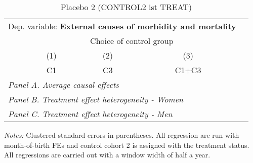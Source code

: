  \begin{table}[H] \centering \begin{threeparttable} \caption{Placebo 2 (CONTROL2 ist TREAT) } {\def\sym#1{\ifmmode^{#1}\else\(^{#1}\)\fi} \begin{tabular}{l*{4}{c}} \toprule \multicolumn{4}{l}{Dep. variable: \textbf{External causes of morbidity and mortality}} \\ & \multicolumn{3}{c}{Choice of control group} \\ \cmidrule(lr){2-4}
            &\multicolumn{1}{c}{(1)}&\multicolumn{1}{c}{(2)}&\multicolumn{1}{c}{(3)}\\
            &\multicolumn{1}{c}{C1}&\multicolumn{1}{c}{C3}&\multicolumn{1}{c}{C1+C3}\\
\midrule
 \multicolumn{4}{l}{\emph{Panel A. Average causal effects}} \\      \midrule\multicolumn{4}{l}{\emph{Panel B. Treatment effect heterogeneity - Women}} \\      \midrule\multicolumn{4}{l}{\emph{Panel C. Treatment effect heterogeneity - Men}} \\      
\bottomrule \end{tabular} } \begin{tablenotes} \item \scriptsize \emph{Notes:} Clustered standard errors in parentheses. All regression are run with month-of-birth FEs and control cohort 2 is assigned with the treatment status. All regressions are carried out with a window width of half a year. \end{tablenotes} \end{threeparttable} \end{table} 
